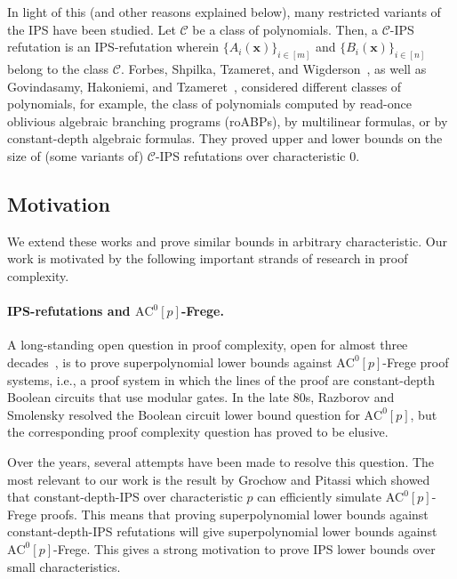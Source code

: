 \documentclass[11pt]{article}
\newcommand{\xbar}{\mathbf{x}}
\newcommand{\ACz}{\text{AC}^0}
\begin{document}
 In light of this (and other reasons explained below), many restricted variants of the IPS have been studied. Let $\mathcal{C}$ be a class of polynomials. Then, a $\mathcal{C}$-IPS refutation is an IPS-refutation wherein $\{A_i(\xbar)\}_{i \in [m]}$ and $\{B_i(\xbar)\}_{i \in [n]}$ belong to the class $\mathcal{C}$. Forbes, Shpilka, Tzameret, and Wigderson~\cite{FSTW21}, as well as Govindasamy, Hakoniemi, and Tzameret~\cite{GHT}, considered different classes of polynomials, for example, the class of polynomials computed by read-once oblivious algebraic branching programs (roABPs), by multilinear formulas, or by constant-depth algebraic formulas. They proved upper and lower bounds on the size of (some variants of) $\mathcal{C}$-IPS refutations over characteristic $0$. 
\subsection{Motivation}
\label{sec:motivation}
We extend these works and prove similar bounds in arbitrary characteristic. 
Our work is motivated by the following important strands of research in proof complexity. 

\paragraph{IPS-refutations and $\ACz[p]$-Frege.}
A long-standing open question in proof complexity, open for almost three decades~\cite{kra2015}, is to prove superpolynomial lower bounds against $\ACz[p]$-Frege proof systems, i.e., a proof system in which the lines of the proof are constant-depth Boolean circuits that use modular gates. In the late 80s, Razborov \cite{Razborov1987} and Smolensky \cite{Smolensky1987, Smolensky1993} resolved the Boolean circuit lower bound question for $\ACz[p]$, but the corresponding proof complexity question has proved to be elusive. 

Over the years, several attempts have been made to resolve this question. The most relevant to our work is the result by Grochow and Pitassi \cite[Theorem 3.5]{GP14} which showed that constant-depth-IPS over characteristic $p$ can efficiently simulate $\ACz[p]$-Frege proofs. This means that proving superpolynomial lower bounds against constant-depth-IPS refutations will give superpolynomial lower bounds against $\ACz[p]$-Frege. This gives a strong motivation to prove IPS lower bounds over small characteristics. 
\end{document}
